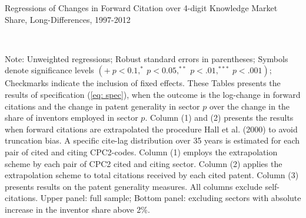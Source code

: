 \begin{table}
\caption{Regressions of Changes in Forward Citation over 4-digit Knowledge
Market Share, Long-Differences, 1997-2012\label{tab: RegFwdCite}}

\begin{centering}
\par\end{centering}

\begin{centering}
\\
\par\end{centering}
\raggedright{}{\small{}Note: Unweighted regressions; Robust standard
errors in parentheses; Symbols denote significance levels $\left(+\ p<0.1,^{*}\ p<0.05,^{**}\ p<.01,^{***}\ p<.001\right)$;
Checkmarks indicate the inclusion of fixed effects. These Tables presents
the results of specification (\ref{eq: spec}), when the outcome is
the log-change in forward citations and the change in patent generality
in sector $p$ over the change in the share of inventors employed
in sector $p$. Column (1) and (2) presents the results when forward
citations are extrapolated the procedure Hall et al. (2000) to avoid
truncation bias. A specific cite-lag distribution over 35 years is
estimated for each pair of cited and citing CPC2-codes. Column (1)
employs the extrapolation scheme by each pair of CPC2 cited and citing
sector. Column (2) applies the extrapolation scheme to total citations
received by each cited patent. Column (3) presents results on the
patent generality measures. All columns exclude self-citations. Upper
panel: full sample; Bottom panel: excluding sectors with absolute
increase in the inventor share above 2\%.}{\small\par}
\end{table}
